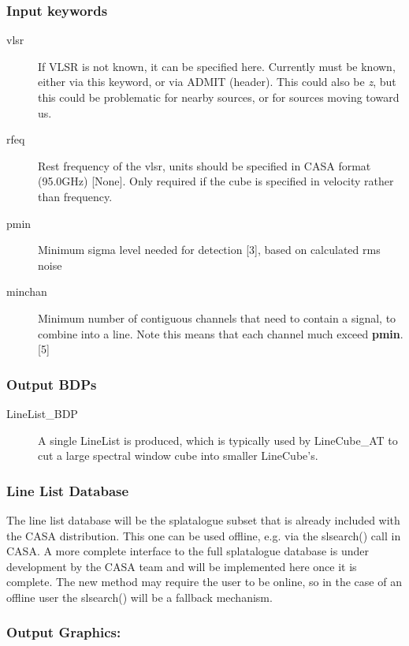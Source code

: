 \subsubsection{Input keywords}

\begin{description}
\item[vlsr] If VLSR is not known, it can be specified here. Currently must be known, either via this keyword, or via ADMIT (header). This could also be {\it z}, but this could be problematic for nearby sources, or for sources moving toward us.
\item[rfeq] Rest frequency of the vlsr, units should be specified in CASA format (95.0GHz) [None]. Only required if the cube is specified in velocity rather than frequency.
\item[pmin] Minimum sigma level needed for detection [3], based on calculated rms noise
\item[minchan] Minimum number of contiguous channels that need to contain
a signal, to combine into a line. Note this means that each channel much
exceed {\bf pmin}.  [5]
\end{description}

\subsubsection{Output BDPs}

\begin{description}
\item[LineList\_BDP] A single LineList is produced, which is typically used by LineCube\_AT
to cut a large spectral window cube into smaller LineCube's.
\end{description}

\subsubsection{Line List Database}

The line list database will be the splatalogue subset that is already included with the CASA distribution.
This one can be used offline, e.g. via the slsearch() call in CASA.
A more complete interface to the full splatalogue database is under development by the CASA team and will be implemented here once it is complete. The new method may require the user to be online, so in the case of an offline user the slsearch() will be a fallback mechanism.

\subsubsection{Output Graphics:}

